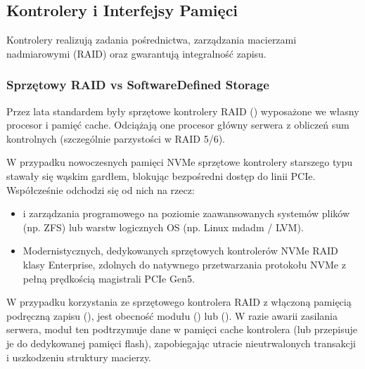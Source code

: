 \documentclass[a4paper,11pt,english,openany,oneside]{sphinxmanual}
\begin{document}
\subsection{Kontrolery i Interfejsy Pamięci}
\label{\detokenize{rozdzial_2/rozdzial_21/index:kontrolery-i-interfejsy-pamieci}}
\sphinxAtStartPar
Kontrolery realizują zadania pośrednictwa, zarządzania macierzami nadmiarowymi (RAID) oraz gwarantują integralność zapisu.


\subsubsection{Sprzętowy RAID vs Software\sphinxhyphen{}Defined Storage}
\label{\detokenize{rozdzial_2/rozdzial_21/index:sprzetowy-raid-vs-software-defined-storage}}
\sphinxAtStartPar
Przez lata standardem były sprzętowe kontrolery RAID () wyposażone we własny procesor i pamięć cache. Odciążają one procesor główny serwera z obliczeń sum kontrolnych (szczególnie parzystości w RAID 5/6).

\sphinxAtStartPar
W przypadku nowoczesnych pamięci NVMe sprzętowe kontrolery starszego typu stawały się wąskim gardłem, blokując bezpośredni dostęp do linii PCIe. Współcześnie odchodzi się od nich na rzecz:
\begin{itemize}
\item {} 
\sphinxAtStartPar
{} i zarządzania programowego na poziomie zaawansowanych systemów plików (np. ZFS) lub warstw logicznych OS (np. Linux mdadm / LVM).

\item {} 
\sphinxAtStartPar
Modernistycznych, dedykowanych sprzętowych kontrolerów NVMe RAID klasy Enterprise, zdolnych do natywnego przetwarzania protokołu NVMe z pełną prędkością magistrali PCIe Gen5.

\end{itemize}

\sphinxAtStartPar
{}
W przypadku korzystania ze sprzętowego kontrolera RAID z włączoną pamięcią podręczną zapisu (),  jest obecność modułu  () lub  (). W razie awarii zasilania serwera, moduł ten podtrzymuje dane w pamięci cache kontrolera (lub przepisuje je do dedykowanej pamięci flash), zapobiegając utracie nieutrwalonych transakcji i uszkodzeniu struktury macierzy.
\end{document}
